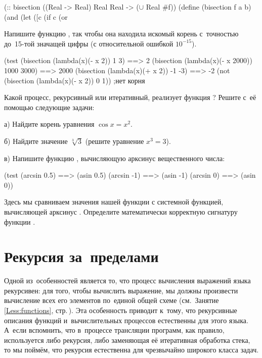 \newcommand{\cmt}{\normalfont\itshape\color{gray!40!black}}
\begin{Definition}[emph={f,a,b}]
(:: bisection ((Real -> Real) Real Real -> ($\cup$ Real #f))
  (define (bisection f a b)
    (and %
         (let ([c %
           (if %
               c
               (or %
\end{Definition}\vspace{-\medskipamount}

\newpage
\begin{Assignment}

Напишите функцию , так чтобы она находила искомый корень с~точностью до~15-той значащей цифры (с относительной ошибкой $10^{-15}$).

\begin{Specification}
  (test 
    (bisection (lambda(x)(- x 2)) 1 3)          ==> 2
    (bisection (lambda(x)(- x 2000)) 1000 3000) ==> 2000
    (bisection (lambda(x)(+ x 2)) -1 -3)        ==> -2
    (not (bisection (lambda(x)(- x 2)) 0 1))    ;нет корня    
\end{Specification}

Какой процесс, рекурсивный или итеративный, реализует функция ? Решите с~её помощью следующие задачи:

 а) Найдите корень уравнения $\cos x = x^2$.
 
 б) Найдите значение $\sqrt[3]3$ (решите уравнение $x^3 = 3$).

 в) Напишите функцию , вычисляющую арксинус вещественного числа:
\begin{Specification}
  (test 
    (arcsin 0.5)  ==> (asin 0.5)
    (arcsin -1)   ==> (asin -1)
    (arcsin 0)    ==> (asin 0))
\end{Specification}
Здесь мы сравниваем значения нашей функции с системной функцией, вычисляющей арксинус . Определите математически корректную сигнатуру функции .

\end{Assignment}

\section{Рекурсия за~преде\-лами~\Scheme}%
Одной из~особенностей \Scheme является то, что процесс вычисления выражений языка рекурсивен: для того, чтобы вычислить выражение, мы должны произвести вычисление всех его элементов по~единой общей схеме (см.~Занятие\,\ref{Less:functions}, стр.\,\pageref{applicative-order}). Эта особенность приводит к~тому, что рекурсивные описания функций и~вычислительных процессов естественны для этого языка. А~если вспомнить, что в~процессе трансляции программ, как правило, используется либо рекурсия, либо заменяющая её итеративная обработка стека, то мы поймём, что рекурсия естественна для чрезвычайно широкого класса задач.

